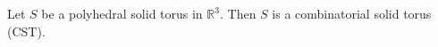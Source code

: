 Let $S$ be a polyhedral solid torus in $\mathbb{R}^3$. Then $S$ is a combinatorial solid torus (CST).

